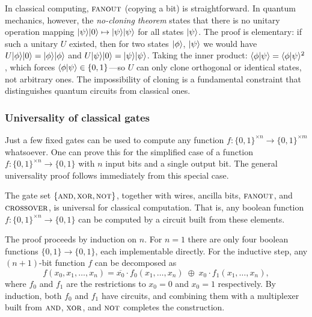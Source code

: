 \begin{remark}
  In classical computing, $\textsc{fanout}$ (copying a bit) is
  straightforward.  In quantum mechanics, however, the \emph{no-cloning
    theorem} states that there is no unitary operation mapping
  $|\psi\rangle|0\rangle\mapsto|\psi\rangle|\psi\rangle$ for all states
  $|\psi\rangle$.  The proof is elementary: if such a unitary $U$ existed,
  then for two states $|\phi\rangle$, $|\psi\rangle$ we would have
  $U|\phi\rangle|0\rangle = |\phi\rangle|\phi\rangle$ and
  $U|\psi\rangle|0\rangle = |\psi\rangle|\psi\rangle$.  Taking the inner product:
  $\langle\phi|\psi\rangle = \langle\phi|\psi\rangle^2$, which forces
  $\langle\phi|\psi\rangle\in\{0,1\}$---so $U$ can only clone orthogonal or
  identical states, not arbitrary ones.
  The impossibility of cloning is a fundamental constraint that distinguishes
  quantum circuits from classical ones.
\end{remark}

\subsubsection{Universality of classical gates}

Just a few fixed gates can be used to compute any function
$f:\{0,1\}^{\times n} \rightarrow \{0,1\}^{\times m}$ whatsoever.  One can
prove this for the simplified case of a function
$f:\{0,1\}^{\times n} \rightarrow \{0,1\}$ with $n$ input bits and a single
output bit.  The general universality proof follows immediately from this
special case.

\begin{theorem}\label{thm:classical-universality}
  The gate set $\{\textsc{and}, \textsc{xor}, \textsc{not}\}$, together with wires, ancilla bits,
  $\textsc{fanout}$, and $\textsc{crossover}$, is universal for classical
  computation. That is, any boolean function
  $f:\{0,1\}^{\times n}\to\{0,1\}$ can be computed by a circuit built from
  these elements.
\end{theorem}

\begin{intuition}
  The proof proceeds by induction on $n$.  For $n=1$ there are only four
  boolean functions $\{0,1\}\to\{0,1\}$, each implementable directly. For
  the inductive step, any $(n+1)$-bit function $f$ can be decomposed as
  \[
    f(x_0, x_1,\ldots,x_n) =
    \overline{x_0}\cdot f_0(x_1,\ldots,x_n)
    \;\oplus\;
    x_0 \cdot f_1(x_1,\ldots,x_n),
  \]
  where $f_0$ and $f_1$ are the restrictions to $x_0=0$ and $x_0=1$
  respectively. By induction, both $f_0$ and $f_1$ have circuits, and
  combining them with a multiplexer built from $\textsc{and}$, $\textsc{xor}$, and $\textsc{not}$
  completes the construction.
\end{intuition}


